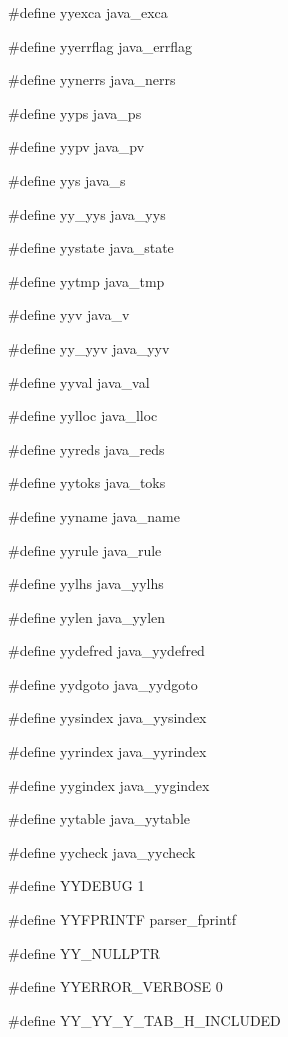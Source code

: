 \medskip
{\stt \#define yyexca java\_exca}

\medskip
{\stt \#define yyerrflag java\_errflag}

\medskip
{\stt \#define yynerrs java\_nerrs}

\medskip
{\stt \#define yyps java\_ps}

\medskip
{\stt \#define yypv java\_pv}

\medskip
{\stt \#define yys java\_s}

\medskip
{\stt \#define yy\_yys java\_yys}

\medskip
{\stt \#define yystate java\_state}

\medskip
{\stt \#define yytmp java\_tmp}

\medskip
{\stt \#define yyv java\_v}

\medskip
{\stt \#define yy\_yyv java\_yyv}

\medskip
{\stt \#define yyval java\_val}

\medskip
{\stt \#define yylloc java\_lloc}

\medskip
{\stt \#define yyreds java\_reds}

\medskip
{\stt \#define yytoks java\_toks}

\medskip
{\stt \#define yyname java\_name}

\medskip
{\stt \#define yyrule java\_rule}

\medskip
{\stt \#define yylhs java\_yylhs}

\medskip
{\stt \#define yylen java\_yylen}

\medskip
{\stt \#define yydefred java\_yydefred}

\medskip
{\stt \#define yydgoto java\_yydgoto}

\medskip
{\stt \#define yysindex java\_yysindex}

\medskip
{\stt \#define yyrindex java\_yyrindex}

\medskip
{\stt \#define yygindex java\_yygindex}

\medskip
{\stt \#define yytable java\_yytable}

\medskip
{\stt \#define yycheck java\_yycheck}

\medskip
{\stt \#define YYDEBUG 1}

\medskip
{\stt \#define YYFPRINTF parser\_fprintf}

\medskip
{\stt \#define YY\_NULLPTR}

\medskip
{\stt \#define YYERROR\_VERBOSE 0}

\medskip
{\stt \#define YY\_YY\_Y\_TAB\_H\_INCLUDED}

